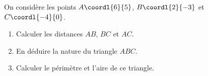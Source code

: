 \begin{exo}
	On considère les points $A\coordl{6}{5}$, $B\coordl{2}{-3}$ et $C\coordl{-4}{0}$.
	\begin{enumerate}
		\item Calculer les distances $AB$, $BC$ et $AC$.
		\item En déduire la nature du triangle $ABC$.
		\item Calculer le périmètre et l'aire de ce triangle.
	\end{enumerate}
\end{exo}

